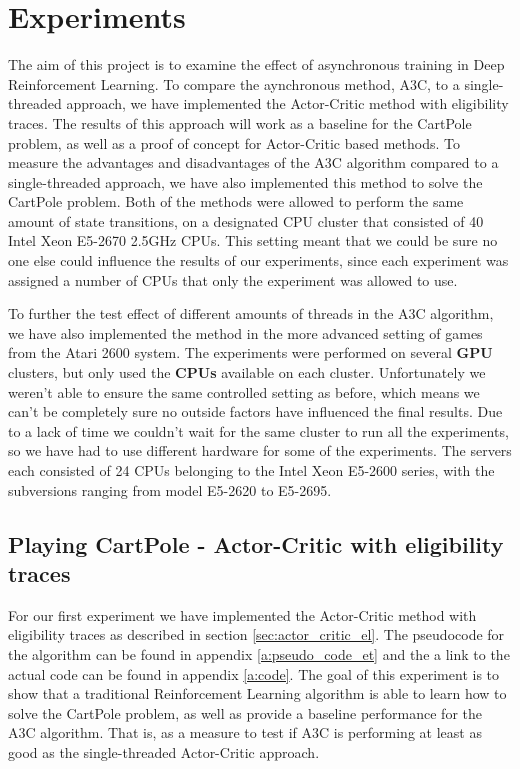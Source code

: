 \documentclass[11pt]{article}
\begin{document}

\section{Experiments}

The aim of this project is to examine the effect of asynchronous training
in Deep Reinforcement Learning.
To compare the aynchronous method, A3C, to a single-threaded approach,
we have implemented the Actor-Critic method with eligibility traces.
The results of this approach will work as a baseline for the
CartPole problem, as well as a proof of concept for Actor-Critic based
methods.
To measure the advantages and disadvantages of the A3C algorithm
compared to a single-threaded approach, we have also implemented this method
to solve the CartPole problem.
Both of the methods were allowed to perform the same amount of state transitions,
on a designated CPU cluster that consisted of 40 Intel Xeon E5-2670 2.5GHz CPUs.
This setting meant that we could be sure no one else could influence the results
of our experiments, since each experiment was assigned a number of CPUs
that only the experiment was allowed to use.

To further the test effect of different amounts of threads in the A3C algorithm,
we have also implemented the method in the more advanced setting of
games from the Atari 2600 system.
The experiments were performed on several \textbf{GPU} clusters, but only used 
the \textbf{CPUs} available on each cluster.
Unfortunately we weren't able to ensure the same controlled
setting as before, which means we can't be completely sure
no outside factors have influenced the final results.
Due to a lack of time we couldn't wait for the same cluster to
run all the experiments, so we have had to use different hardware
for some of the experiments.
The servers each consisted of 24 CPUs belonging to the Intel Xeon
E5-2600 series, with the subversions ranging from model E5-2620 to
E5-2695.

\subsection{Playing CartPole - Actor-Critic with eligibility traces}

For our first experiment we have implemented the Actor-Critic method
with eligibility traces as described in section \ref{sec:actor_critic_el}.
The pseudocode for the algorithm can be found in
appendix \ref{a:pseudo_code_et} and the a link to the actual
code can be found in appendix \ref{a:code}.
The goal of this experiment is to show that a 
traditional Reinforcement Learning algorithm
is able to learn how to solve the CartPole problem, as well as provide a
baseline performance for the A3C algorithm.
That is, as a measure to test if A3C is performing at least as good
as the single-threaded Actor-Critic approach.
\end{document}
